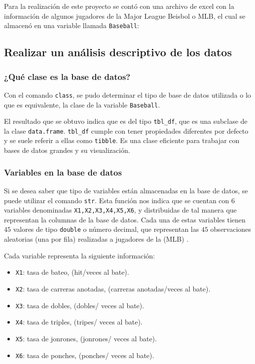 \documentclass{staprojteamusb}
\providecommand{\tightlist}{%
	\setlength{\itemsep}{0pt}\setlength{\parskip}{0pt}}
\begin{document}
 Para la realización de este proyecto se contó con una archivo de excel
 con la información de algunos jugadores de la Major League Beisbol o
 MLB, el cual se almacenó en una variable llamada \texttt{Baseball}:

 \hypertarget{realizar-un-anuxe1lisis-descriptivo-de-los-datos}{%
 \subsection{Realizar un análisis descriptivo de los
 datos}\label{realizar-un-anuxe1lisis-descriptivo-de-los-datos}}

 \hypertarget{quuxe9-clase-es-la-base-de-datos}{%
 \subsubsection{¿Qué clase es la base de
 datos?}\label{quuxe9-clase-es-la-base-de-datos}}

 Con el comando \texttt{class}, se pudo determinar el tipo de base de
 datos utilizada o lo que es equivalente, la clase de la variable
 \texttt{Baseball}.

 El resultado que se obtuvo indica que es del tipo \texttt{tbl\_df}, que
 es una subclase de la clase \texttt{data.frame}. \texttt{tbl\_df}
 cumple con tener propiedades diferentes por defecto y se suele referir
 a ellas como \texttt{tibble}. Es una clase eficiente para trabajar con
 bases de datos grandes y su visualización.

 \hypertarget{variables-en-la-base-de-datos}{%
 \subsubsection{Variables en la base de
 datos}\label{variables-en-la-base-de-datos}}

 Si se desea saber que tipo de variables están almacenadas en la base de
 datos, se puede utilizar el comando \texttt{str}. Esta función nos
 indica que se cuentan con \(6\) variables denominadas
 \texttt{X1,X2,X3,X4,X5,X6}, y distribuidas de tal manera que
 representan la columnas de la base de datos. Cada una de estas
 variables tienen \(45\) valores de tipo \texttt{double} o número
 decimal, que representan las \(45\) observaciones aleatorias (una por
 fila) realizadas a jugadores de la (MLB) .

 Cada variable representa la siguiente información:

 \begin{itemize}
 \tightlist
 \item
   \texttt{X1}: tasa de bateo, (hit/veces al bate).
 \item
   \texttt{X2}: tasa de carreras anotadas, (carreras anotadas/veces al
   bate).
 \item
   \texttt{X3}: tasa de dobles, (dobles/ veces al bate).
 \item
   \texttt{X4}: tasa de triples, (tripes/ veces al bate).
 \item
   \texttt{X5}: tasa de jonrones, (jonrones/ veces al bate).
 \item
   \texttt{X6}: tasa de ponches, (ponches/ veces al bate).
 \end{itemize}
\end{document}
